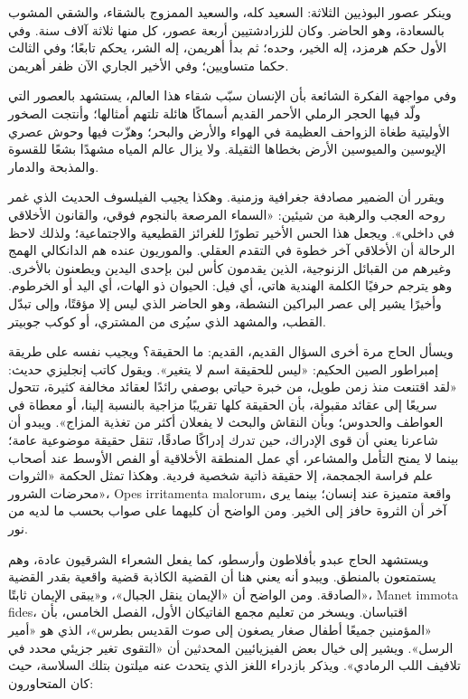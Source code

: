 وينكر عصور البوذيين الثلاثة: السعيد كله، والسعيد الممزوج بالشقاء، والشقي المشوب بالسعادة، وهو الحاضر. وكان للزرادشتيين أربعة عصور، كل منها ثلاثة آلاف سنة. وفي الأول حكم هرمزد، إله الخير، وحده؛ ثم بدأ أهريمن، إله الشر، يحكم تابعًا؛ وفي الثالث حكما متساويين؛ وفي الأخير الجاري الآن ظفر أهريمن.

وفي مواجهة الفكرة الشائعة بأن الإنسان سبّب شقاء هذا العالم، يستشهد بالعصور التي ولّد فيها الحجر الرملي الأحمر القديم أسماكًا هائلة تلتهم أمثالها؛ وأنتجت الصخور الأوليتية طغاة الزواحف العظيمة في الهواء والأرض والبحر؛ وهزّت فيها وحوش عصري الإيوسين والميوسين الأرض بخطاها الثقيلة. ولا يزال عالم المياه مشهدًا بشعًا للقسوة والمذبحة والدمار.

ويقرر أن الضمير مصادفة جغرافية وزمنية. وهكذا يجيب الفيلسوف الحديث الذي غمر روحه العجب والرهبة من شيئين: «السماء المرصعة بالنجوم فوقي، والقانون الأخلاقي في داخلي». ويجعل هذا الحس الأخير تطورًا للغرائز القطيعية والاجتماعية؛ ولذلك لاحظ الرحالة أن الأخلاقي آخر خطوة في التقدم العقلي. والموريون عنده هم الدانكالي الهمج وغيرهم من القبائل الزنوجية، الذين يقدمون كأس لبن بإحدى اليدين ويطعنون بالأخرى. وهو يترجم حرفيًا الكلمة الهندية هاتي، أي فيل: الحيوان ذو الهات، أي اليد أو الخرطوم. وأخيرًا يشير إلى عصر البراكين النشطة، وهو الحاضر الذي ليس إلا مؤقتًا، وإلى تبدّل القطب، والمشهد الذي سيُرى من المشتري، أو كوكب جوبيتر.

ويسأل الحاج مرة أخرى السؤال القديم، القديم: ما الحقيقة؟ ويجيب نفسه على طريقة إمبراطور الصين الحكيم: «ليس للحقيقة اسم لا يتغير». ويقول كاتب إنجليزي حديث: «لقد اقتنعت منذ زمن طويل، من خبرة حياتي بوصفي رائدًا لعقائد مخالفة كثيرة، تتحول سريعًا إلى عقائد مقبولة، بأن الحقيقة كلها تقريبًا مزاجية بالنسبة إلينا، أو معطاة في العواطف والحدوس؛ وبأن النقاش والبحث لا يفعلان أكثر من تغذية المزاج». ويبدو أن شاعرنا يعني أن قوى الإدراك، حين تدرك إدراكًا صادقًا، تنقل حقيقة موضوعية عامة؛ بينما لا يمنح التأمل والمشاعر، أي عمل المنطقة الأخلاقية أو الفص الأوسط عند أصحاب علم فراسة الجمجمة، إلا حقيقة ذاتية شخصية فردية. وهكذا تمثل الحكمة «الثروات محرضات الشرور»، \textenglish{Opes irritamenta malorum}، واقعة متميزة عند إنسان؛ بينما يرى آخر أن الثروة حافز إلى الخير. ومن الواضح أن كليهما على صواب بحسب ما لديه من نور.

ويستشهد الحاج عبدو بأفلاطون وأرسطو، كما يفعل الشعراء الشرقيون عادة، وهم يستمتعون بالمنطق. ويبدو أنه يعني هنا أن القضية الكاذبة قضية واقعية بقدر القضية الصادقة. ومن الواضح أن «الإيمان ينقل الجبال»، و«يبقى الإيمان ثابتًا»، \textenglish{Manet immota fides}، اقتباسان. ويسخر من تعليم مجمع الفاتيكان الأول، الفصل الخامس، بأن «المؤمنين جميعًا أطفال صغار يصغون إلى صوت القديس بطرس»، الذي هو «أمير الرسل». ويشير إلى خيال بعض الفيزيائيين المحدثين أن «التقوى تغير جزيئي محدد في تلافيف اللب الرمادي». ويذكر بازدراء اللغز الذي يتحدث عنه ميلتون بتلك السلاسة، حيث كان المتحاورون:

